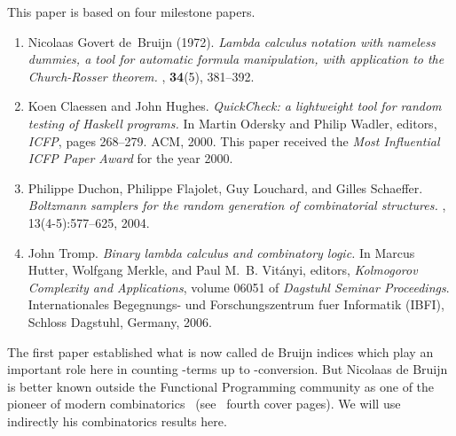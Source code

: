\documentclass{sig-alternate}
\begin{document}
This paper is based on four milestone papers.
\begin{enumerate}[label=\roman*]
\item \cite{NGDeBruijn108} Nicolaas Govert de~Bruijn (1972).  \emph{Lambda calculus
    notation with nameless dummies, a tool for automatic formula manipulation, with
    application to the {Church-Rosser} theorem.}  , {\bf 34}(5), 381--392.
\item \cite{DBLP:conf/icfp/ClaessenH00} Koen Claessen and John Hughes.
  \emph{\textsf{QuickCheck}: a light\-weight tool for random testing of
    \textsf{Haskell} programs.}  \newblock In Martin Odersky and Philip Wadler,
  editors, {\em ICFP}, pages 268--279. ACM, 2000. This paper received the \emph{Most
    Influential ICFP Paper Award} for the year 2000.
\item \cite{DBLP:journals/cpc/DuchonFLS04} Philippe Duchon, Philippe Flajolet, Guy
  Louchard, and Gilles Schaeffer.  \emph{Boltzmann samplers for the random generation
    of combinatorial structures.}  , 13(4-5):577--625, 2004.
\item
  \begin{sloppypar}
    \cite{DBLP:conf/dagstuhl/Tromp06} John Tromp.  \emph{Binary lambda calculus and
      combinatory logic.}  \newblock In Marcus Hutter, Wolfgang Merkle, and Paul
    M.~B. Vit{\'a}nyi, editors, {\em Kolmogorov Complexity and Applications}, volume
    06051 of {\em Dagstuhl Seminar Proceedings}. Internationales Begegnungs- und
    Forschungszentrum fuer Informatik (IBFI), Schloss Dagstuhl, Germany, 2006.
  \end{sloppypar}

\end{enumerate}

The first paper established what is now called de Bruijn indices which play an
important role here in counting -terms up to -conversion.  But Nicolaas de
Bruijn is better known outside the Functional Programming community as one of the
pioneer of modern combinatorics~\cite{bruijn58:_asymp_method_analy}
(see~\cite{knuth00:_selec_paper_analy_algor} fourth cover pages).  We will use
indirectly his combinatorics results here.
\end{document}
